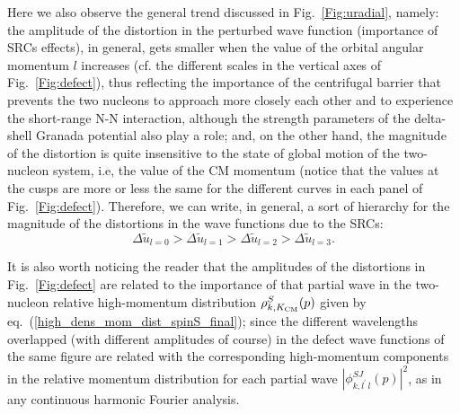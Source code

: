 \documentclass[aps,twocolumn,showpacs,preprintnumbers,amsmath,amssymb,nofootinbib,superscriptaddress,showkeys,noeprint]{revtex4-1}
\begin{document}
Here we also observe the general trend discussed in
Fig.~\ref{Fig:uradial}, namely: the amplitude of the distortion in the
perturbed wave function (importance of SRCs effects), in general, gets
smaller when the value of the orbital angular momentum $l$ increases
(cf. the different scales in the vertical axes of
Fig.~\ref{Fig:defect}), thus reflecting the importance of the
centrifugal barrier that prevents the two nucleons to approach more
closely each other and to experience the short-range N-N interaction,
although the strength parameters of the delta-shell Granada potential
also play a role; and, on the other hand, the magnitude of the
distortion is quite insensitive to the state of global motion of the
two-nucleon system, i.e, the value of the CM momentum (notice that the
values at the cusps are more or less the same for the different curves
in each panel of Fig.~\ref{Fig:defect}). Therefore, we can write, in
general, a sort of hierarchy for the magnitude of the distortions in
the wave functions due to the SRCs:
  \begin{equation}\label{eq:hierarchy}
  \Delta\widetilde{u}_{l=0} >
  \Delta\widetilde{u}_{l=1} >
   \Delta\widetilde{u}_{l=2} >
    \Delta\widetilde{u}_{l=3}.
  \end{equation}
  
  It is also worth noticing the reader that the amplitudes of the
  distortions in Fig.~\ref{Fig:defect} are related to the importance
  of that partial wave in the two-nucleon relative high-momentum
  distribution $\rho^{S}_{k,K_{\rm CM}}(p)$ given by
  eq.~(\ref{high_dens_mom_dist_spinS_final}); since the different
  wavelengths overlapped (with different amplitudes of course) in the
  defect wave functions of the same figure are related with the
  corresponding high-momentum components in the relative momentum
  distribution for each partial wave $\left| \phi^{SJ}_{k,
    l^\prime\,l}(p) \right|^2$, as in any continuous harmonic Fourier
  analysis.
 
\end{document}
